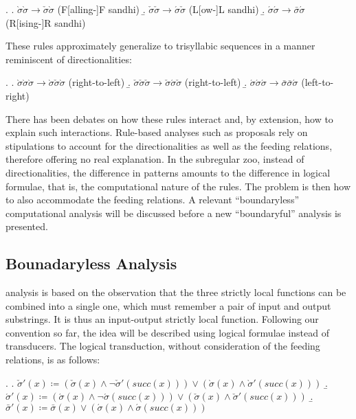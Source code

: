 \documentclass[12pt, a4paper]{report}
\begin{document}
\ex.
\a. \(\grave{\sigma}\grave{\sigma} \to \check{\sigma}\grave{\sigma}\)
\hfill(F[alling-]F sandhi)
\b. \(\check{\sigma}\check{\sigma} \to \acute{\sigma}\check{\sigma}\)
\hfill(L[ow-]L sandhi)
\b. \(\acute{\sigma}\acute{\sigma} \to \bar{\sigma}\acute{\sigma}\)
\hfill(R[ising-]R sandhi)

These rules approximately generalize to trisyllabic sequences in a
manner reminiscent of directionalities:

\ex.
\a. \(\grave{\sigma}\grave{\sigma}\grave{\sigma} \to
\grave{\sigma}\check{\sigma}\grave{\sigma}\)
\hfill(right-to-left)
\b. \(\check{\sigma}\check{\sigma}\check{\sigma} \to
\check{\sigma}\acute{\sigma}\check{\sigma}\)
\hfill(right-to-left)
\b. \(\acute{\sigma}\acute{\sigma}\acute{\sigma} \to
\bar{\sigma}\bar{\sigma}\acute{\sigma}\)
\hfill(left-to-right)


There has been debates on how these rules interact and, by extension,
how to explain such interactions.  Rule-based analyses such as
 proposals rely on stipulations to account
for the directionalities as well as the feeding relations, therefore
offering no real explanation.  In the subregular zoo, instead of
directionalities, the difference in patterns amounts to the difference
in logical formulae, that is, the computational nature of the rules.
The problem is then how to also accommodate the feeding relations.  A
relevant \enquote{boundaryless} computational analysis will be
discussed before a new \enquote{boundaryful} analysis is presented.

\subsection{Bounadaryless Analysis}
 analysis is based on the observation that the
three strictly local functions can be combined into a single one,
which must remember a pair of input and output substrings.  It is thus
an input-output strictly local function.  Following our convention so
far, the idea will be described using logical formulae instead of
transducers.  The logical transduction, without consideration of the
feeding relations, is as follows:

\ex.
\a. \(\check{\sigma}'(x) \coloneq
(\check{\sigma}(x) \land \neg\check{\sigma}'(\mathit{succ}(x))) \lor
(\grave{\sigma}(x) \land \grave{\sigma}'(\mathit{succ}(x)))\)
\b. \(\acute{\sigma}'(x) \coloneq
(\acute{\sigma}(x) \land \neg\acute{\sigma}(\mathit{succ}(x))) \lor
(\check{\sigma}(x) \land \check{\sigma}'(\mathit{succ}(x)))\)
\b. \(\bar{\sigma}'(x) \coloneq \bar{\sigma}(x) \lor
(\acute{\sigma}(x) \land \acute{\sigma}(\mathit{succ}(x)))\)
\end{document}
